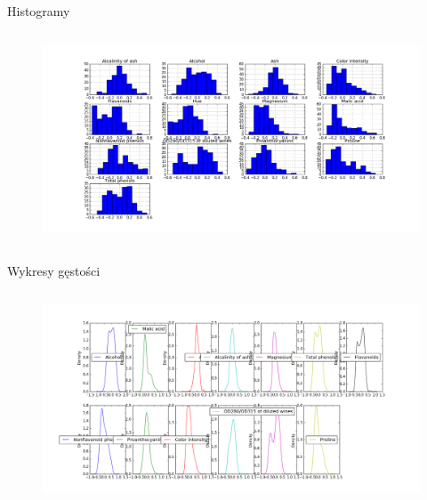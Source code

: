 \documentclass[xcolor=x11names,compress]{beamer}
\renewcommand{\(}{\begin{columns}}
\renewcommand{\)}{\end{columns}}
\newcommand{\<}[1]{\begin{column}{#1}}
\renewcommand{\>}{\end{column}}
\begin{document}
\begin{frame}{Histogramy}
	\begin{columns}
	\column{\dimexpr\paperwidth-20pt}

        \begin{figure}\includegraphics[width=1\textwidth]{hist_chart.png} \end{figure}
 \end{columns}

\end{frame}

\begin{frame}{Wykresy gęstości}
	\begin{columns}
	\column{\dimexpr\paperwidth-20pt}

        \begin{figure}\includegraphics[width=1\textwidth]{density_chart.png} \end{figure}
 \end{columns}
\end{frame}

%
%
\end{document}
